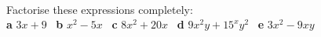 \documentclass[fleqn]{article}
\begin{document}
\begin{examplebox}{}{}
	\\ %
	Factorise these expressions completely:	\\
	\textbf{a}\hspace{2mm} $3x+9$			\hspace{7mm} \
	\textbf{b}\hspace{2mm} $x^2-5x$ 			\hspace{7mm} \
	\textbf{c}\hspace{2mm} $8x^2+20x$		\hspace{7mm} \
	\textbf{d}\hspace{2mm} $9x^2y+15^xy^2$	\hspace{7mm} \
	\textbf{e}\hspace{2mm} $3x^2-9xy$		\hspace{7mm} \
\end{examplebox}
\end{document}
